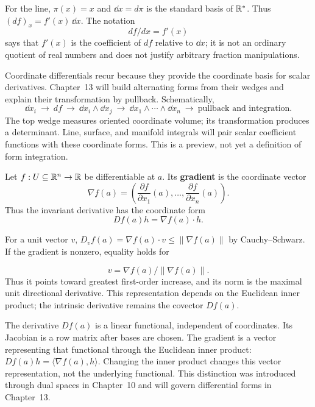 For the line, $\pi(x)=x$ and $\dd x=d\pi$ is the standard basis of
$\mathbb{R}^*$. Thus $(df)_x=f'(x)\,\dd x$. The notation
\[
df/dx=f'(x)
\]
 says that
$f'(x)$ is the coefficient of $df$ relative to $\dd x$; it is not an
ordinary quotient of real numbers and does not justify arbitrary fraction
manipulations.

Coordinate differentials recur because they provide the coordinate basis
for scalar derivatives. Chapter~13 will build alternating forms from their
wedges and explain their transformation by pullback. Schematically,
\[
\dd x_i\ \longrightarrow\ df\ \longrightarrow\ \dd x_i\wedge\dd x_j
\ \longrightarrow\ \dd x_1\wedge\cdots\wedge\dd x_n
\ \longrightarrow\ \text{pullback and integration}.
\]
The top wedge measures oriented coordinate volume; its transformation
produces a determinant. Line, surface, and manifold integrals will pair
scalar coefficient functions with these coordinate forms. This is a preview,
not yet a definition of form integration.

\begin{definition}\label{def:euclidean-gradient}
Let $f:U\subseteq\mathbb{R}^n\to\mathbb{R}$ be differentiable at $a$.  Its
\textbf{gradient} is the coordinate vector
\[
\nabla f(a)=
\left(\frac{\partial f}{\partial x_1}(a),\ldots,
\frac{\partial f}{\partial x_n}(a)\right).
\]
Thus the invariant derivative has the coordinate form
\[
Df(a)h=\nabla f(a)\cdot h.
\]
\end{definition}
For a unit vector $v$, $D_vf(a)=\nabla f(a)\cdot v\leq\|\nabla f(a)\|$
by Cauchy--Schwarz. If the gradient is nonzero, equality holds for

\[
v=\nabla f(a)/\|\nabla f(a)\|.
\]
 Thus it points toward greatest
first-order increase, and its norm is the maximal unit directional
derivative. This representation depends on the Euclidean inner product;
the intrinsic derivative remains the covector $Df(a)$.

The derivative $Df(a)$ is a linear functional, independent of coordinates.
Its Jacobian is a row matrix after bases are chosen. The gradient is a vector
representing that functional through the Euclidean inner product:
$Df(a)h=\langle\nabla f(a),h\rangle$. Changing the inner product changes
this vector representation, not the underlying functional. This distinction
was introduced through dual spaces in Chapter~10 and will govern
differential forms in Chapter~13.


